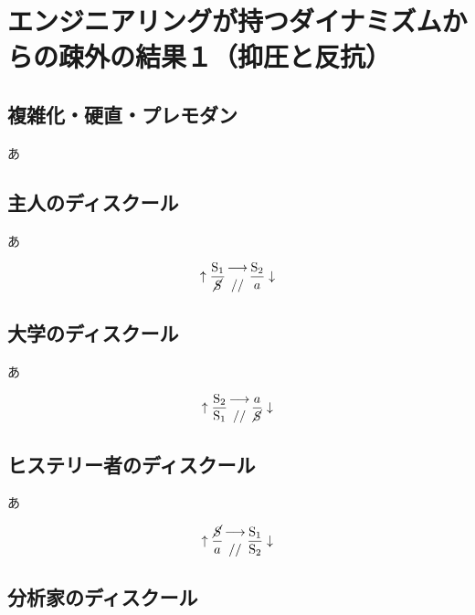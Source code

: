 \section{エンジニアリングが持つダイナミズムからの疎外の結果１（抑圧と反抗）}\label{ux7b2cux5341ux7ae0ux30a8ux30f3ux30b8ux30cbux30a2ux30eaux30f3ux30b0ux304cux6301ux3064ux30c0ux30a4ux30caux30dfux30baux30e0ux304bux3089ux306eux758eux5916ux306eux7d50ux679cuxff11ux6291ux5727ux3068ux53cdux6297}

\subsection{複雑化・硬直・プレモダン}\label{ux8907ux96d1ux5316ux786cux76f4ux30d7ux30ecux30e2ux30c0ux30f3}

あ

\subsection{主人のディスクール}\label{ux4e3bux4ebaux306eux30c7ux30a3ux30b9ux30afux30fcux30eb}

あ

\[
\uparrow\frac{\mathrm{S_1}}{\mathrm{\cancel{S}}}\genfrac{}{}{0pt}{}{\longrightarrow}{//}\frac{\mathrm{S_2}}{a}\downarrow
\]

\subsection{大学のディスクール}\label{ux5927ux5b66ux306eux30c7ux30a3ux30b9ux30afux30fcux30eb}

あ

\[
\uparrow\frac{\mathrm{S_2}}{\mathrm{S_1}}\genfrac{}{}{0pt}{}{\longrightarrow}{//}\frac{a}{\mathrm{\cancel{S}}}\downarrow
\]

\subsection{ヒステリー者のディスクール}\label{ux30d2ux30b9ux30c6ux30eaux30fcux8005ux306eux30c7ux30a3ux30b9ux30afux30fcux30eb}

あ

\[
\uparrow\frac{\mathrm{\cancel{S}}}{a}\genfrac{}{}{0pt}{}{\longrightarrow}{//}\frac{\mathrm{S_1}}{\mathrm{S_2}}\downarrow
\]

\subsection{分析家のディスクール}\label{ux5206ux6790ux5bb6ux306eux30c7ux30a3ux30b9ux30afux30fcux30eb}

